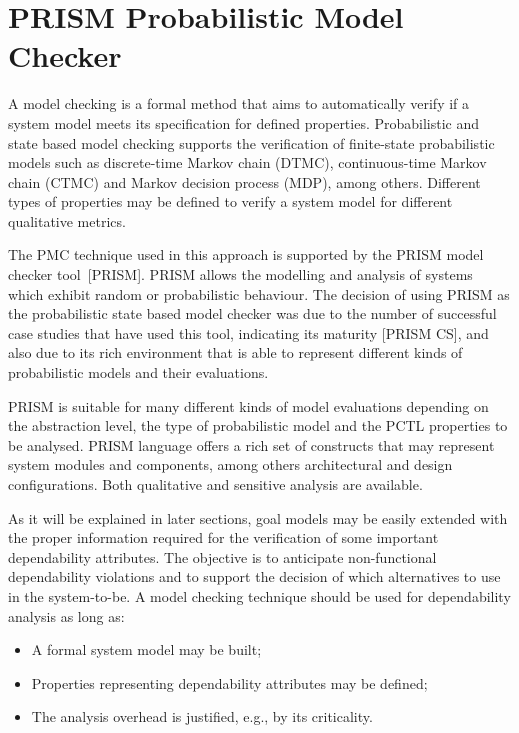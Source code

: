 \section{PRISM Probabilistic Model Checker}

A model checking is a formal method that aims to automatically verify if a system model meets its specification for defined properties. Probabilistic and state based model checking supports the verification of finite-state probabilistic models such as discrete-time Markov chain (DTMC), continuous-time Markov chain (CTMC) and Markov decision process (MDP), among others. Different types of properties may be defined to verify a system model for different qualitative metrics.

The PMC technique used in this approach is supported by the PRISM model checker tool~[PRISM]. PRISM allows the modelling and analysis of systems which exhibit random or probabilistic behaviour. The decision of using PRISM as the probabilistic state based model checker was due to the number of successful case studies that have used this tool, indicating its maturity [PRISM CS], and also due to its rich environment that is able to represent different kinds of probabilistic models and their evaluations. 

PRISM is suitable for many different kinds of model evaluations depending on the abstraction level, the type of probabilistic model and the PCTL properties to be analysed. PRISM language offers a rich set of constructs that may represent system modules and components, among others architectural and design configurations. Both qualitative and sensitive analysis are available.

As it will be explained in later sections, goal models may be easily extended with the proper information required for the verification of some important dependability attributes. The objective is to anticipate non-functional dependability violations and to support the decision of which alternatives to use in the system-to-be. A model checking technique should be used for dependability analysis as long as: 

\begin{itemize}

\item A formal system model may be built;
\medskip

\item Properties representing dependability attributes may be defined;
\medskip

\item The analysis overhead is justified, e.g., by its criticality.
\bigskip

\end{itemize}

